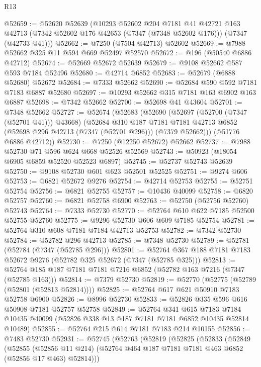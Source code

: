 \begin{lexlean}{R13}
\begin{coremodule}
@52659 := @52620
    @52639
    (@10293
      @52602
      @204
      @7181
      @41
      @42721
      @163
      @42713
      (@7342 @52602 @176 @42653 (@7347 (@7348 @52602 @176)))
      (@7347 (@42733 @41)))
@52662 := @7250 (@7504 @42713) @52602
@52669 := @7988 @52662 @325 @11 @594 @669 @52497 @52570
@52672 := @196 (@50540 @6886 @42712)
@52674 := @52669 @52672 @52639
@52679 := @9108 @52662 @587 @593 @7184 @52496
@52680 := @42714 @6852
@52683 := @52679 (@6888 @52680) @52672
@52684 := @7333 @52662
@52690 := @52684 @590 @592 @7181 @7183 @6887 @52680
@52697 := @10293 @52662 @315 @7181 @163 @6902 @163 @6887
@52698 := @7342 @52662
@52700 := @52698 @41 @43604
@52701 := @7348 @52662
@52727 := @52674
    (@52683
      (@52690
        (@52697 (@52700 (@7347 (@52701 @41))) @43668)
        (@52684
          @310
          @187
          @7181
          @7181
          @42713
          @6852
          (@52698 @296 @42713 (@7347 (@52701 @296)))
          (@7379 @52662)))
      (@51776 @6886 @42712))
@52730 := @7250 (@12250 @52672) @52662
@52737 := @7988 @52730 @71 @596 @624 @668 @52526 @52569
@52743 := @50923 (@18054 @6905 @6859 @52520 @52523 @6897)
@52745 := @52737 @52743 @52639
@52750 := @9108 @52730 @601 @623 @52501 @52525
@52751 := @9274 @606
@52753 := @6821 @52672 @9276
@52754 := @42714 @52753
@52755 := @52751 @52754
@52756 := @6821 @52755
@52757 := @10436 @40099
@52758 := @6820 @52757
@52760 := @6821 @52758 @6900
@52763 := @52750 (@52756 @52760) @52743
@52764 := @7333 @52730
@52770 := @52764 @610 @622 @7185 @52500 @52755 @52760
@52775 := @9296 @52730 @606 @609 @7185 @52754
@52781 := @52764 @310 @608 @7181 @7184 @42713 @52753
@52782 := @7342 @52730
@52784 := @52782 @296 @42713
@52785 := @7348 @52730
@52789 := @52781 (@52784 (@7347 (@52785 @296)))
@52801 := @52764 @367 @188 @7181 @7183 @52672 @9276 (@52782 @325 @52672 (@7347 (@52785 @325)))
@52813 := @52764 @185 @187 @7181 @7181 @7216 @6852 (@52782 @163 @7216 (@7347 (@52785 @163)))
@52814 := @7379 @52730
@52819 := @52770 (@52775 (@52789 (@52801 (@52813 @52814))))
@52825 := @52764 @617 @621 @50910 @7183 @52758 @6900
@52826 := @8996 @52730
@52833 := @52826 @335 @596 @616 @50908 @7181 @52757 @52758
@52849 := @52764
    @341
    @615
    @7183
    @7184
    @10435
    @40099
    (@52826 @338 @13 @187 @7181 @7181 @6852 @10435 @52814 @10489)
@52855 := @52764 @215 @614 @7181 @7183 @214 @10155
@52856 := @7483 @52730
@52931 := @52745
    (@52763
      (@52819
        (@52825
          (@52833
            (@52849
              (@52855
                (@52856 @11 @214)
                (@52764 @464 @187 @7181 @7181 @463 @6852 (@52856 @17 @463) @52814)))

\end{coremodule}
\end{lexlean}

